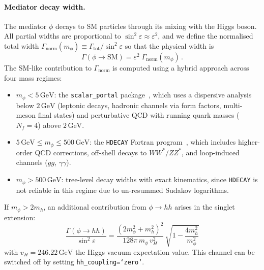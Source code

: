 \documentclass[11pt]{article}
\numberwithin{equation}{section}
\newcommand{\GeV}{\,\text{GeV}}
\newcommand{\epsX}{\varepsilon}
\begin{document}
\paragraph{Mediator decay width.}
The mediator $\phi$ decays to SM particles through its mixing with the Higgs boson. All partial widths are proportional to $\sin^2\!\epsX \approx \epsX^2$, and we define the normalised total width $\Gamma_{\text{norm}}(m_\phi) \equiv \Gamma_{\text{tot}}/\sin^2\!\epsX$ so that the physical width is
\begin{equation}
    \Gamma(\phi\to\text{SM}) = \epsX^2\;\Gamma_{\text{norm}}(m_\phi)\,.
\end{equation}
The SM-like contribution to $\Gamma_{\text{norm}}$ is computed using a hybrid approach across four mass regimes:
\begin{itemize}
    \item $m_\phi < 5\GeV$: the \texttt{scalar\_portal} package~\cite{Winkler:2018qyg}, which uses a dispersive analysis below $2\GeV$ (leptonic decays, hadronic channels via form factors, multi-meson final states) and perturbative QCD with running quark masses ($N_f = 4$) above $2\GeV$.
    \item $5\GeV \leq m_\phi \leq 500\GeV$: the \texttt{HDECAY} Fortran program~\cite{Djouadi:1997yw, Djouadi:2018xqq}, which includes higher-order QCD corrections, off-shell decays to $WW^*/ZZ^*$, and loop-induced channels ($gg$, $\gamma\gamma$).
    \item $m_\phi > 500\GeV$: tree-level decay widths with exact kinematics, since \texttt{HDECAY} is not reliable in this regime due to un-resummed Sudakov logarithms.
\end{itemize} If $m_\phi > 2m_h$, an additional contribution from $\phi\to hh$ arises in the singlet extension:
\begin{equation}
    \frac{\Gamma(\phi\to hh)}{\sin^2\!\epsX} = \frac{(2m_\phi^2 + m_h^2)^2}{128\pi\,m_\phi\,v_H^2}\,\sqrt{1 - \frac{4m_h^2}{m_\phi^2}}
\end{equation}
with $v_H = 246.22\GeV$ the Higgs vacuum expectation value. This channel can be switched off by setting \texttt{hh\_coupling=`zero'}.
\end{document}

